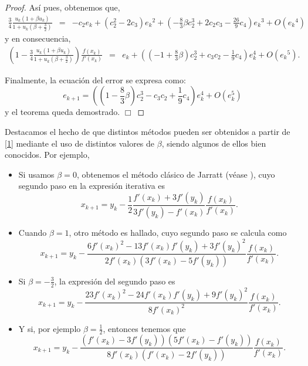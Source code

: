 \begin{proof}
	Así pues, obtenemos que,
	\begin{eqnarray*}
		\frac{3}{4} \frac{u_k(1+\beta u_k)}{1+u_k (\beta+\frac{3}{2})} &=&
		- {c_2}{e_k} + (c_2^2 - 2{c_3}){e_k}^2 + ( - \frac{8}{3}\beta c_2^3
		+ 2{c_2}{c_3} - \frac{{26}}{9}{c_4}){e_k}^3+ O({e_k}^4)
	\end{eqnarray*}
	y en consecuencia,
	\begin{eqnarray*}
		\left(1-\frac{3}{4} \frac{u_k(1+\beta u_k)}{1+u_k
			(\beta+\frac{3}{2})}\right)\frac{f(x_k)}{f'(x_k)}
		&=&  {e_k} + \left(\left(-1 + \frac{8}{3}\beta\right)c_2^3  + {c_3}{c_2} - \frac{1}{9}{c_4}\right)e_k^{4} + O({e_k}^5).
	\end{eqnarray*}
	
	Finalmente, la ecuación del error se expresa como:
	\begin{equation*}\label{12}
	e_{k + 1} = \left(\left(1 - \frac{8}{3}\beta\right)c_2^3  - {c_3}{c_2} + \frac{1}{9}{c_4}\right)e_k^{4} + O({e_k^{5}})
	\end{equation*}
	y el teorema queda demostrado. $\Box$
\end{proof}

Destacamos el hecho de que distintos métodos pueden ser obtenidos a partir de \eqref{1} mediante el uso de distintos valores de $\beta$, siendo algunos de ellos bien conocidos. Por ejemplo,
\begin{itemize}
	\item Si usamos $\beta=0$, obtenemos el método clásico de Jarratt (véase \cite{Jarratt}), cuyo segundo paso en la expresión iterativa es
	\[
	x_{k+1} =
	y_k-\frac{1}{2}\frac{f'(x_k)+3f'(y_k)}{3f'(y_k)-f'(x_k)}\frac{f(x_k)}{f'(x_k)}.
	\]
	\item Cuando $\beta=1$, otro método es hallado, cuyo segundo paso se calcula como
	\[
	x_{k+1} =
	y_k-\frac{6f'(x_k)^2-13f'(x_k)f'(y_k)+3f'(y_k)^2}{2f'(x_k)(3f'(x_k)-5f'(y_k))}\frac{f(x_k)}{f'(x_k)}.
	\]
	\item Si $\beta=-\frac{3}{2}$, la expresión del segundo paso es
	\[
	x_{k+1} =
	y_k-\frac{23f'(x_k)^2-24f'(x_k)f'(y_k)+9f'(y_k)^2}{8f'(x_k)^2}\frac{f(x_k)}{f'(x_k)}.
	\]
	\item Y si, por ejemplo $\beta=\frac{1}{2}$, entonces tenemos que
	\[
	x_{k+1} =
	y_k-\frac{(f'(x_k)-3f'(y_k))(5f'(x_k)-f'(y_k))}{8f'(x_k)(f'(x_k)-2f'(y_k))}\frac{f(x_k)}{f'(x_k)}.
	\]
\end {itemize}
	
